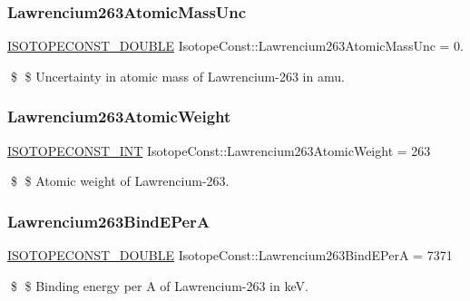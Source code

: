 \subsubsection{\texorpdfstring{Lawrencium263\+Atomic\+Mass\+Unc}{Lawrencium263AtomicMassUnc}}
{\footnotesize\ttfamily \mbox{\hyperlink{group___isotope_const-_macros_ga8f45a7272ce02c0b4c65c44636ed719a}{I\+S\+O\+T\+O\+P\+E\+C\+O\+N\+S\+T\+\_\+\+D\+O\+U\+B\+LE}} Isotope\+Const\+::\+Lawrencium263\+Atomic\+Mass\+Unc = 0.}

\$ \$ Uncertainty in atomic mass of Lawrencium-\/263 in amu. \mbox{\label{group___isotope_const-_lawrencium-_lr263_ga3d185af501bdbd88062f19cad701f5cc}} 
\subsubsection{\texorpdfstring{Lawrencium263\+Atomic\+Weight}{Lawrencium263AtomicWeight}}
{\footnotesize\ttfamily \mbox{\hyperlink{group___isotope_const-_macros_ga5f18360b3e99483a35c32d789e62621c}{I\+S\+O\+T\+O\+P\+E\+C\+O\+N\+S\+T\+\_\+\+I\+NT}} Isotope\+Const\+::\+Lawrencium263\+Atomic\+Weight = 263}

\$ \$ Atomic weight of Lawrencium-\/263. \mbox{\label{group___isotope_const-_lawrencium-_lr263_ga2daf464048a747f064bea4e6f6f49274}} 
\subsubsection{\texorpdfstring{Lawrencium263\+Bind\+E\+PerA}{Lawrencium263BindEPerA}}
{\footnotesize\ttfamily \mbox{\hyperlink{group___isotope_const-_macros_ga8f45a7272ce02c0b4c65c44636ed719a}{I\+S\+O\+T\+O\+P\+E\+C\+O\+N\+S\+T\+\_\+\+D\+O\+U\+B\+LE}} Isotope\+Const\+::\+Lawrencium263\+Bind\+E\+PerA = 7371}

\$ \$ Binding energy per A of Lawrencium-\/263 in keV. \mbox{\label{group___isotope_const-_lawrencium-_lr263_ga538e67ee1b2c05473a9e1817905505d8}} 
